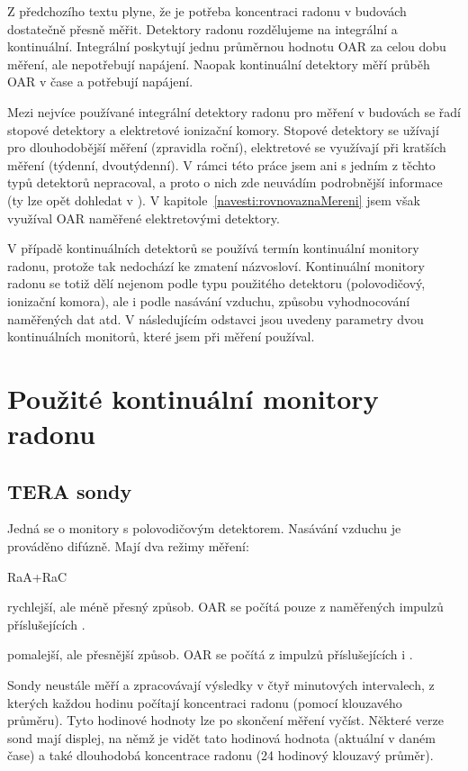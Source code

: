 Z předchozího textu plyne, že je potřeba koncentraci radonu v budovách dostatečně přesně měřit. Detektory radonu rozdělujeme na integrální a kontinuální. Integrální poskytují jednu průměrnou hodnotu OAR za celou dobu měření, ale nepotřebují napájení. Naopak kontinuální detektory měří průběh OAR v čase a potřebují napájení. 

Mezi nejvíce používané integrální detektory radonu pro měření v budovách se řadí stopové detektory a elektretové ionizační komory. Stopové detektory se užívají pro dlouhodobější měření (zpravidla roční), elektretové se využívají při kratších měření (týdenní, dvoutýdenní). V rámci této práce jsem ani s jedním z těchto typů detektorů nepracoval, a proto o nich zde neuvádím podrobnější informace (ty lze opět dohledat v \cite{SURO}). V kapitole~\ref{navesti:rovnovaznaMereni} jsem však využíval OAR naměřené elektretovými detektory.

V případě kontinuálních detektorů se používá termín kontinuální monitory radonu, protože tak nedochází ke zmatení názvosloví. Kontinuální monitory radonu se totiž dělí nejenom podle typu použitého detektoru (polovodičový, ionizační komora), ale i podle nasávání vzduchu, způsobu vyhodnocování naměřených dat atd. V následujícím odstavci jsou uvedeny parametry dvou kontinuálních monitorů, které jsem při měření používal.

\section{Použité kontinuální monitory radonu}
\subsection{TERA sondy}
Jedná se o monitory s polovodičovým detektorem. Nasávání vzduchu je prováděno difúzně. Mají dva režimy měření:
\begin{labeling}{RaA+RaC}
    \item[RaA] rychlejší, ale méně přesný způsob. OAR se počítá pouze z naměřených impulzů příslušejících .
    \item[RaA+RaC] pomalejší, ale přesnější způsob. OAR se počítá z impulzů příslušejících  i .
\end{labeling}

Sondy neustále měří a zpracovávají výsledky v čtyř minutových intervalech, z kterých každou hodinu počítají koncentraci radonu (pomocí klouzavého průměru). Tyto hodinové hodnoty lze po skončení měření vyčíst. Některé verze sond mají displej, na němž je vidět tato hodinová hodnota (aktuální v daném čase) a také dlouhodobá koncentrace radonu (24 hodinový klouzavý průměr). \cite{tera}


